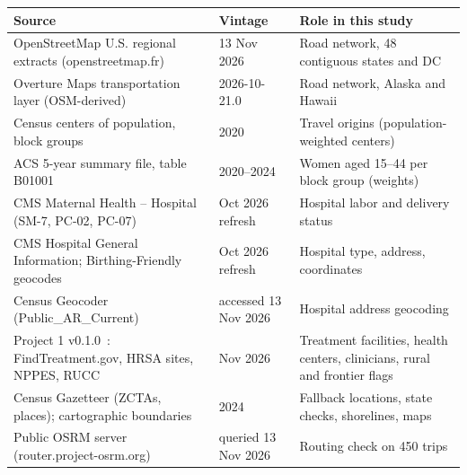 \begin{tabular}{@{}p{}p{}p{}@{}}
\toprule
Source & Vintage & Role in this study \\
\midrule
OpenStreetMap U.S. regional extracts (openstreetmap.fr) & 13 Nov 2026 & Road network, 48 contiguous states and DC \\
Overture Maps transportation layer (OSM-derived) & 2026-10-21.0 & Road network, Alaska and Hawaii \\
Census centers of population, block groups & 2020 & Travel origins (population-weighted centers) \\
ACS 5-year summary file, table B01001 & 2020--2024 & Women aged 15--44 per block group (weights) \\
CMS Maternal Health -- Hospital (SM-7, PC-02, PC-07) & Oct 2026 refresh & Hospital labor and delivery status \\
CMS Hospital General Information; Birthing-Friendly geocodes & Oct 2026 refresh & Hospital type, address, coordinates \\
Census Geocoder (Public\_AR\_Current) & accessed 13 Nov 2026 & Hospital address geocoding \\
Project 1 v0.1.0~\cite{emesobum_p1}: FindTreatment.gov, HRSA sites, NPPES, RUCC & Nov 2026 & Treatment facilities, health centers, clinicians, rural and frontier flags \\
Census Gazetteer (ZCTAs, places); cartographic boundaries & 2024 & Fallback locations, state checks, shorelines, maps \\
Public OSRM server (router.project-osrm.org) & queried 13 Nov 2026 & Routing check on 450 trips \\
\bottomrule
\end{tabular}
